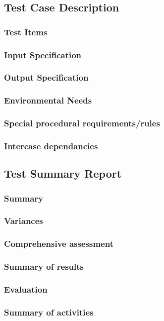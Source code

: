 \documentclass[a4paper,12pt]{article}
\begin{document}
 \subsection{Test Case Description}
\subsubsection{Test Items}
\subsubsection{Input Specification}
\subsubsection{Output Specification}
\subsubsection{Environmental Needs}
\subsubsection{Special procedural requirements/rules}
\subsubsection{Intercase dependancies}

\subsection{Test Summary Report}
\subsubsection{Summary}
\subsubsection{Variances}
\subsubsection{Comprehensive assessment}
\subsubsection{Summary of results}
\subsubsection{Evaluation}
\subsubsection{Summary of activities}
\end{document}
